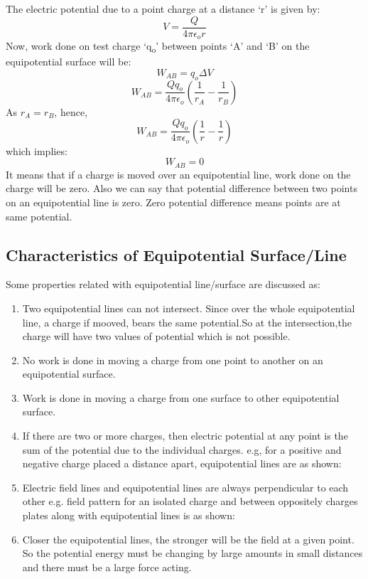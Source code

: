 The electric potential due to a
point charge at a distance ‘r’ is given by:
\begin{equation}
  V = \frac{Q}{4\pi\epsilon_{o}r}  \nonumber
\end{equation}
Now, work done on test charge ‘q\textsubscript{o}’ between points ‘A’ and
‘B’ on the equipotential surface will be:
\begin{equation}\nonumber
  W_{AB} = q_{o}\Delta V
\end{equation}
\begin{equation}\nonumber
  W_{AB} = \frac{Qq_{o}}{4\pi\epsilon_{o} } (\frac{1}{r_{A}} - \frac{1}{r_{B}})
\end{equation}
As $r_{A} = r_{B}$, hence, 
\begin{equation}\nonumber
  W_{AB} = \frac{Qq_{o}}{4\pi\epsilon_{o} } (\frac{1}{r} - \frac{1}{r})
\end{equation}
which implies:
\begin{equation}\nonumber
  W_{AB} = 0
\end{equation}
It means that if a charge is moved over an equipotential line,
work done on the charge will be zero. Also we can say that potential difference
between two points on an equipotential line is zero. Zero potential difference
means points are at same potential.
\subsection{Characteristics of Equipotential Surface/Line}
Some properties related with equipotential line/surface are discussed as:
\begin{enumerate}[label = (\roman*)]
\item Two equipotential lines can not intersect.
Since over the whole equipotential line, a charge if mooved,
bears the same potential.So at the intersection,the charge
will have two values of potential which is not possible.
\item No work is done in moving a charge from one point to another on
an equipotential surface.
\item Work is done in moving a charge from one surface to other
equipotential surface.
\item If there are two or more charges, then electric potential at
any point is the sum of the potential due to the individual charges.
e.g, for a positive and negative charge placed a distance apart,
equipotential lines are as shown:
\item Electric field lines and equipotential lines are always 
perpendicular to each other e.g. field pattern for an isolated
charge and between oppositely charges plates along with equipotential
lines is as shown:
\item Closer the equipotential lines,
the stronger will be the field at a given point.
So the potential energy must be changing by large amounts in
small distances and there must be a large force acting.
\end{enumerate}

